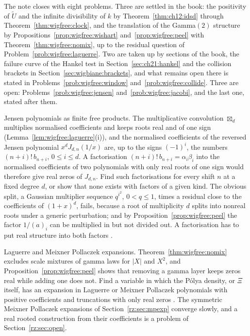 The note \cite{P26wig} closes with eight problems. Three are settled in the book: the positivity of $\widetilde U$ and the infinite divisibility of $k$ by Theorem~\ref{thm:ch12:idsd} through Theorem~\ref{thm:wigfree:clock}, and the translation of the Gamma$(2)$ structure by Propositions~\ref{prop:wigfree:wishart} and~\ref{prop:wigfree:peel} with Theorem~\ref{thm:wigfree:nomix}, up to the residual question of Problem~\ref{prob:wigfree:laguerre}. Two are taken up by sections of the book, the failure curve of the Hankel test in Section~\ref{sec:ch21:hankel} and the collision brackets in Section~\ref{sec:wigbiane:brackets}, and what remains open there is stated in Problems~\ref{prob:wigfree:window} and~\ref{prob:wigfree:collide}. Three are open: Problems~\ref{prob:wigfree:jensen} and~\ref{prob:wigfree:jacobi}, and the last one, stated after them.

\begin{problem}\label{prob:wigfree:jensen}
Jensen polynomials as finite free products. The multiplicative convolution $\boxtimes_d$ multiplies normalised coefficients and keeps roots real and of one sign (Lemma~\ref{lem:wigfree:laguerre}(i)), and the normalised coefficients of the reversed Jensen polynomial $x^dJ_{d,n}(1/x)$ are, up to the signs $(-1)^i$, the numbers $(n+i)!\,b_{n+i}$, $0\le i\le d$. A factorisation $(n+i)!\,b_{n+i}=\alpha_i\beta_i$ into the normalised coefficients of two polynomials with only real roots of one sign would therefore give real zeros of $J_{d,n}$. Find such factorisations for every shift $n$ at a fixed degree $d$, or show that none exists with factors of a given kind. The obvious split, a Gaussian multiplier sequence $q^{i^2}$, $0<q\le1$, times a residual close to the coefficients of $(1+x)^d$, fails, because a root of multiplicity $d$ splits into nonreal roots under a generic perturbation; and by Proposition~\ref{prop:wigfree:peel} the factor $1/(a)_i$ can be multiplied in but not divided out. A factorisation has to put real structure into both factors \cite{P26wig}.
\end{problem}

\begin{problem}\label{prob:wigfree:laguerre}
Laguerre and Meixner Pollaczek expansions. Theorem~\ref{thm:wigfree:nomix} excludes scale mixtures of gamma laws for $|X|$ and $X^2$, and Proposition~\ref{prop:wigfree:peel} shows that removing a gamma layer keeps zeros real while adding one does not. Find a variable in which the P\'olya density, or $\Xi$ itself, has an expansion in Laguerre or Meixner Pollaczek polynomials with positive coefficients and truncations with only real zeros \cite{P26wig}. The symmetric Meixner Pollaczek expansions of Section~\ref{rz:sec:mpexp} converge slowly, and a real rooted construction from their coefficients is a problem of Section~\ref{rz:sec:open}.
\end{problem}

